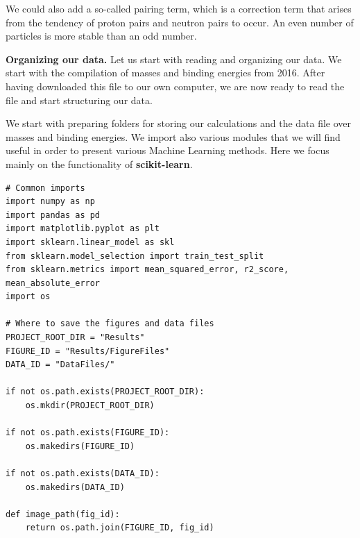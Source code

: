 \documentclass{beamer}
\begin{document}
\begin{frame}
\noindent
We could also add a so-called pairing term, which is a correction term that
arises from the tendency of proton pairs and neutron pairs to
occur. An even number of particles is more stable than an odd number. 

\noindent\textbf{Organizing our data.}
Let us start with reading and organizing our data. 
We start with the compilation of masses and binding energies from 2016.
After having downloaded this file to our own computer, we are now ready to read the file and start structuring our data.

We start with preparing folders for storing our calculations and the data file over masses and binding energies. We import also various modules that we will find useful in order to present various Machine Learning methods. Here we focus mainly on the functionality of \textbf{scikit-learn}.


































\begin{verbatim}
# Common imports
import numpy as np
import pandas as pd
import matplotlib.pyplot as plt
import sklearn.linear_model as skl
from sklearn.model_selection import train_test_split
from sklearn.metrics import mean_squared_error, r2_score, mean_absolute_error
import os

# Where to save the figures and data files
PROJECT_ROOT_DIR = "Results"
FIGURE_ID = "Results/FigureFiles"
DATA_ID = "DataFiles/"

if not os.path.exists(PROJECT_ROOT_DIR):
    os.mkdir(PROJECT_ROOT_DIR)

if not os.path.exists(FIGURE_ID):
    os.makedirs(FIGURE_ID)

if not os.path.exists(DATA_ID):
    os.makedirs(DATA_ID)

def image_path(fig_id):
    return os.path.join(FIGURE_ID, fig_id)


\end{verbatim}
\end{frame}
\end{document}
